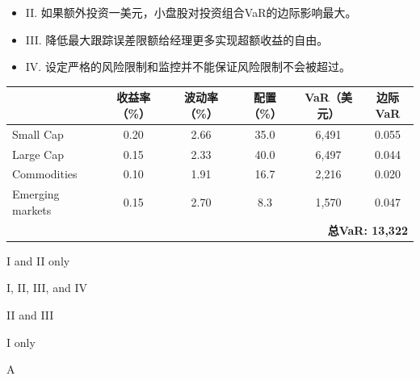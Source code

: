 \documentclass{article}
\newcounter{question} %
\begin{document}
\begin{question}
\begin{itemize}
        \item II. 如果额外投资一美元，小盘股对投资组合VaR的边际影响最大。  
        \item III. 降低最大跟踪误差限额给经理更多实现超额收益的自由。  
        \item IV. 设定严格的风险限制和监控并不能保证风险限制不会被超过。
    \end{itemize}
    \begin{table}[H]
        \centering
        \renewcommand{\arraystretch}{1.2}
        \begin{tabular}{|l|c|c|c|c|c|}
            \hline
            & \textbf{收益率（\%）} & \textbf{波动率（\%）} & \textbf{配置（\%）} & \textbf{VaR（美元）} & \textbf{边际VaR} \\
            \hline
            Small Cap         & 0.20 & 2.66 & 35.0 & 6,491 & 0.055 \\
            Large Cap         & 0.15 & 2.33 & 40.0 & 6,497 & 0.044 \\
            Commodities       & 0.10 & 1.91 & 16.7 & 2,216 & 0.020 \\
            Emerging markets  & 0.15 & 2.70 & 8.3  & 1,570 & 0.047 \\
            \hline
            \multicolumn{6}{|r|}{\textbf{总VaR: 13,322}} \\
            \hline
        \end{tabular}
    \end{table}
\end{question}

\begin{choices}
    \item I and II only
    \item I, II, III, and IV
    \item II and III
    \item I only
\end{choices}

\begin{correctanswer}
    A
\end{correctanswer}
\end{document}
